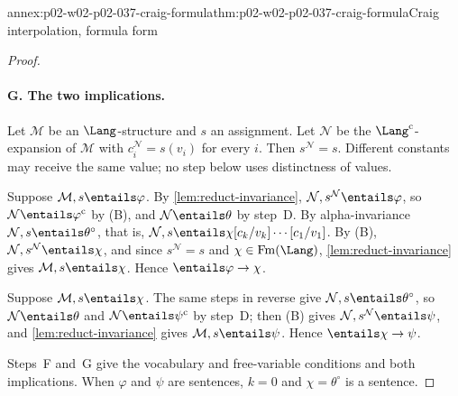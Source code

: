 \begin{annexitem}{annex:p02-w02-p02-037-craig-formula}{thm:p02-w02-p02-037-craig-formula}{Craig interpolation, formula form}
\begin{proof}
\paragraph{G. The two implications.}
Let \(\mathcal M\) be an \(\Lang\)-structure and \(s\) an assignment.  Let
\(\mathcal N\) be the \(\Lang^{\mathrm{c}}\)-expansion of \(\mathcal M\) with
\(c_i^{\mathcal N}=s(v_i)\) for every \(i\).  Then
\(s^{\mathcal N}=s\).  Different constants may receive the same value; no
step below uses distinctness of values.

Suppose \(\mathcal M,s\entails\varphi\).  By \cref{lem:reduct-invariance},
\(\mathcal N,s^{\mathcal N}\entails\varphi\), so
\(\mathcal N\entails\varphi^{\mathrm{c}}\) by (B), and
\(\mathcal N\entails\theta\) by step~D.  By alpha-invariance
\(\mathcal N,s\entails\theta^{\circ}\), that is,
\(\mathcal N,s\entails\chi[c_k/v_k]\cdots[c_1/v_1]\).  By (B),
\(\mathcal N,s^{\mathcal N}\entails\chi\), and since \(s^{\mathcal N}=s\) and
\(\chi\in\operatorname{Fm}(\Lang)\), \cref{lem:reduct-invariance} gives
\(\mathcal M,s\entails\chi\).  Hence \(\entails\varphi\to\chi\).

Suppose \(\mathcal M,s\entails\chi\).  The same steps in reverse give
\(\mathcal N,s\entails\theta^{\circ}\), so \(\mathcal N\entails\theta\) and
\(\mathcal N\entails\psi^{\mathrm{c}}\) by step~D; then (B) gives
\(\mathcal N,s^{\mathcal N}\entails\psi\), and \cref{lem:reduct-invariance}
gives \(\mathcal M,s\entails\psi\).  Hence \(\entails\chi\to\psi\).

Steps~F and~G give the vocabulary and free-variable conditions and both
implications.  When \(\varphi\) and \(\psi\) are sentences, \(k=0\) and
\(\chi=\theta^{\circ}\) is a sentence.
\end{proof}
\end{annexitem}

